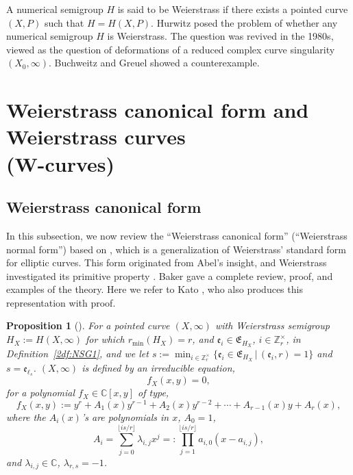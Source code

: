 \documentclass[10pt,a4paper]{amsart}
\def\CC{{\mathbb C}}
\def\ZZ{{\mathbb Z}}
\def\fE{{\mathfrak E}}
\def\fe{{\mathfrak e}}
\numberwithin{equation}{section}
\newtheorem{Proposition}[Theorem]{Proposition}
 { \theoremstyle{definition}
\newtheorem{Definition}[Theorem]{Definition}
\newtheorem{Note}[Theorem]{Note}
\newtheorem{Example}[Theorem]{Example}
\newtheorem{Remark}[Theorem]{Remark} }
\begin{document}
A numerical semigroup $H$ is said to be Weierstrass if there exists a pointed curve $(X, P)$ such that $H=H(X,P)$.
Hurwitz posed the problem of whether any numerical semigroup $H$ is Weierstrass.
The question was revived in the 1980s, viewed as the question of deformations of a reduced complex curve singularity $(X_0,\infty )$.
Buchweitz and Greuel showed a counterexample.

\section[Weierstrass canonical form and Weierstrass curves (W-curves)]{Weierstrass canonical form and Weierstrass curves\\ (W-curves)}\label{sec:WCF}

\subsection{Weierstrass canonical form}

In this subsection, we now review the ``Weierstrass canonical form'' (``Weierstrass normal form'') based on \cite{KM2020, KMP16, KMP19}, which is a generalization of Weierstrass' standard form for elliptic curves.
This form originated from Abel's insight, and Weierstrass investigated its primitive property \cite{Wei67, WeiWIV}.
Baker \cite[Chapter~V, Sections~60--79]{Baker97} gave a complete review, proof, and examples of the theory.
Here we refer to Kato \cite{CoppensKato, Kato80}, who also produces this representation with proof.

\begin{Proposition}[{\cite{CoppensKato, Kato80}}] \label{2pr:WCF}
For a pointed curve $(X,\infty )$ with Weierstrass semigroup $H_X:=H(X,\infty)$
for which $r_{\min}(H_X)=r$, and $\fe_i\in \fE_{H_X}$, $i \in \ZZ_r^\times$, in Definition~{\rm \ref{2df:NSG1}}, and we let
$s:=\min_{i\in \ZZ_r^\times}\{\fe_i \in \fE_{H_X}\, |\, (\fe_i, r)=1\}$ and $s=\fe_{\ell_s}$. $(X,\infty)$ is defined by an irreducible equation,
\begin{equation}
f_X(x,y)= 0,
\label{2eq:WCF1a}
\end{equation}
for a polynomial $f_X\in \CC[x,y]$ of type,
\begin{equation}
f_X(x,y):=y^r + A_{1}(x) y^{r-1}
+ A_{2}(x) y^{r-2}
+\cdots + A_{r-1}(x) y
 + A_{r}(x),
\label{2eq:WCF1b}
\end{equation}
where the $A_i(x)$'s are polynomials in $x$, $A_0=1$,
\begin{equation*}
A_i = \sum_{j=0}^{\lfloor i s/r\rfloor} \lambda_{i, j} x^j=:\prod_{j=1}^{\lfloor i s/r\rfloor}a_{i,0}(x-a_{i,j}),%
\end{equation*}
and $\lambda_{i,j} \in \CC$, $\lambda_{r,s}=-1$.
\end{Proposition}
\end{document}
